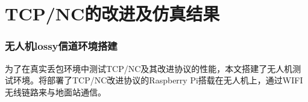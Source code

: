 \chapter{TCP/NC的改进及仿真结果}
\subsection{无人机lossy信道环境搭建}
为了在真实丢包环境中测试TCP/NC及其改进协议的性能，本文搭建了无人机测试环境。将部署了TCP/NC改进协议的Raspberry Pi搭载在无人机上，通过WIFI无线链路来与地面站通信。